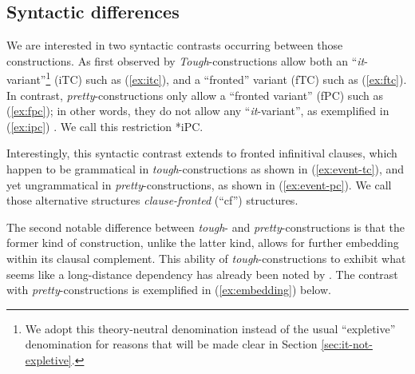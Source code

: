 \documentclass[11pt]{article}
\begin{document}
\subsection{Syntactic differences}
We are interested in two syntactic contrasts occurring between those constructions. As first observed by \cite{Lees1960,  Rosenbaum1967} \textit{Tough}-constructions allow both an ``\textit{it}-variant''\footnote{We adopt this theory-neutral denomination instead of the usual ``expletive'' denomination for reasons that will be made clear in Section \ref{sec:it-not-expletive}.} (iTC) such as (\ref{ex:itc}), and a ``fronted'' variant (fTC) such as (\ref{ex:ftc}). In contrast, \textit{pretty}-constructions only allow a ``fronted variant'' (fPC) such as (\ref{ex:fpc}); in other words, they do not allow any ``\textit{it}-variant'', as exemplified in (\ref{ex:ipc}) \cite{Lasnik1974}. We call this restriction *iPC. 
\begin{exe}
	\ex 
	\begin{xlist}
		\label{ex:ftc}
		\label{ex:itc} 
	\end{xlist}
	\ex 
	\begin{xlist}
		\label{ex:fpc} 
		\label{ex:ipc} 
	\end{xlist}
\end{exe}\label{ex:it-variant}
Interestingly, this syntactic contrast extends to fronted infinitival clauses, which happen to be grammatical in \textit{tough}-constructions as shown in (\ref{ex:event-tc}), and yet ungrammatical in \textit{pretty}-constructions, as shown in (\ref{ex:event-pc}). We call those alternative structures \textit{clause-fronted} (``cf'') structures.
\begin{exe}
	\ex 
	\begin{xlist}
		\label{ex:event-tc}
		\label{ex:event-pc}
	\end{xlist}
\end{exe}
The second notable difference between \textit{tough}- and \textit{pretty}-constructions is that the former kind of construction, unlike the latter kind, allows for further embedding within its clausal complement. This ability of \textit{tough}-constructions to exhibit what seems like a long-distance dependency has already been noted by \cite{Longenbaugh2017}. The contrast with \textit{pretty}-constructions is exemplified in (\ref{ex:embedding}) below.
\end{document}
